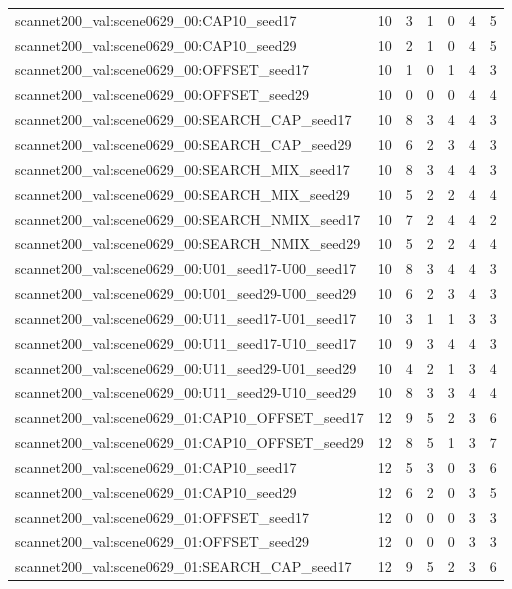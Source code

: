 \begin{table}[t]
\begin{tabular}{lrrrrrr}
scannet200\_val:scene0629\_00:CAP10\_seed17 & 10 & 3 & 1 & 0 & 4 & 5 \\
scannet200\_val:scene0629\_00:CAP10\_seed29 & 10 & 2 & 1 & 0 & 4 & 5 \\
scannet200\_val:scene0629\_00:OFFSET\_seed17 & 10 & 1 & 0 & 1 & 4 & 3 \\
scannet200\_val:scene0629\_00:OFFSET\_seed29 & 10 & 0 & 0 & 0 & 4 & 4 \\
scannet200\_val:scene0629\_00:SEARCH\_CAP\_seed17 & 10 & 8 & 3 & 4 & 4 & 3 \\
scannet200\_val:scene0629\_00:SEARCH\_CAP\_seed29 & 10 & 6 & 2 & 3 & 4 & 3 \\
scannet200\_val:scene0629\_00:SEARCH\_MIX\_seed17 & 10 & 8 & 3 & 4 & 4 & 3 \\
scannet200\_val:scene0629\_00:SEARCH\_MIX\_seed29 & 10 & 5 & 2 & 2 & 4 & 4 \\
scannet200\_val:scene0629\_00:SEARCH\_NMIX\_seed17 & 10 & 7 & 2 & 4 & 4 & 2 \\
scannet200\_val:scene0629\_00:SEARCH\_NMIX\_seed29 & 10 & 5 & 2 & 2 & 4 & 4 \\
scannet200\_val:scene0629\_00:U01\_seed17-U00\_seed17 & 10 & 8 & 3 & 4 & 4 & 3 \\
scannet200\_val:scene0629\_00:U01\_seed29-U00\_seed29 & 10 & 6 & 2 & 3 & 4 & 3 \\
scannet200\_val:scene0629\_00:U11\_seed17-U01\_seed17 & 10 & 3 & 1 & 1 & 3 & 3 \\
scannet200\_val:scene0629\_00:U11\_seed17-U10\_seed17 & 10 & 9 & 3 & 4 & 4 & 3 \\
scannet200\_val:scene0629\_00:U11\_seed29-U01\_seed29 & 10 & 4 & 2 & 1 & 3 & 4 \\
scannet200\_val:scene0629\_00:U11\_seed29-U10\_seed29 & 10 & 8 & 3 & 3 & 4 & 4 \\
scannet200\_val:scene0629\_01:CAP10\_OFFSET\_seed17 & 12 & 9 & 5 & 2 & 3 & 6 \\
scannet200\_val:scene0629\_01:CAP10\_OFFSET\_seed29 & 12 & 8 & 5 & 1 & 3 & 7 \\
scannet200\_val:scene0629\_01:CAP10\_seed17 & 12 & 5 & 3 & 0 & 3 & 6 \\
scannet200\_val:scene0629\_01:CAP10\_seed29 & 12 & 6 & 2 & 0 & 3 & 5 \\
scannet200\_val:scene0629\_01:OFFSET\_seed17 & 12 & 0 & 0 & 0 & 3 & 3 \\
scannet200\_val:scene0629\_01:OFFSET\_seed29 & 12 & 0 & 0 & 0 & 3 & 3 \\
scannet200\_val:scene0629\_01:SEARCH\_CAP\_seed17 & 12 & 9 & 5 & 2 & 3 & 6 \\

\end{tabular}
\end{table}
